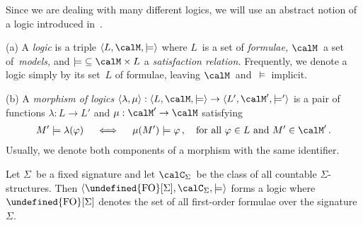 \documentclass[10pt, fleqn]{scrartcl}
\makeatletter
\newcommand\m@thsm@ller[2]{\mbox{\relscale{0.91}$\m@th#1#2$}}
\let\smaller\undefined
\DeclareRobustCommand\smaller[1]{\relax\ifmmode{\mathpalette\m@thsm@ller{#1}}\else{\relscale{0.91}#1}\fi}
\newcommand*{\FO}{\smaller{\mathrm{FO}}}
\newcommand*{\?}{\kern .08em}
\makeatother
\begin{document}
Since we are dealing with many different logics,
we will use an abstract notion of a logic introduced in~\cite{Blumensath21}.
\begin{Def}
(a) A \emph{logic} is a triple $\langle L,\calM,{\models}\rangle$
where $L$~is a set of \emph{formulae,} $\calM$~a set of~\emph{models,} and
${\models} \subseteq \calM \times L$ a \emph{satisfaction relation.}
Frequently, we denote a logic simply by its set~$L$ of formulae, leaving $\calM$~and~$\models$
implicit.

(b) A \emph{morphism of logics}
$\langle\lambda,\mu\rangle : \langle L,\calM,{\models}\rangle \to \langle L',\calM',{\models'}\rangle$
is a pair of functions $\lambda : L \to L'$ and $\mu : \calM' \to \calM$ satisfying
\begin{align*}
  M' \models \lambda(\varphi) \quad\iff\quad \mu(M') \models \varphi\,,
  \quad\text{for all } \varphi \in L \text{ and } M' \in \calM'\,.
\end{align*}
Usually, we denote both components of a morphism with the same identifier.
\end{Def}
\begin{Exam}
Let $\Sigma$~be a fixed signature and let $\calC_\Sigma$~be the class of
all countable $\Sigma$-structures. Then $\langle\FO[\Sigma],\calC_\Sigma,{\models}\rangle$
forms a logic where $\FO[\Sigma]$ denotes the set of all first-order formulae over the
signature~$\Sigma$.
\end{Exam}
\end{document}
